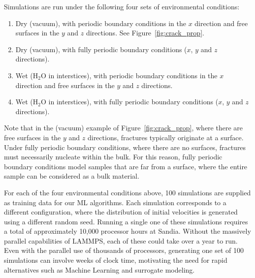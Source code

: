 Simulations are run under the following four sets of environmental conditions:

\begin{enumerate}
    \item Dry (vacuum), with periodic boundary conditions in the $x$ direction and free surfaces in the $y$ and $z$ directions. See Figure~\ref{fig:crack_prop}.
    \item Dry (vacuum), with fully periodic boundary conditions ($x$, $y$ and $z$ directions).
    \item Wet (H$_2$O in interstices), with periodic boundary conditions in the $x$ direction and free surfaces in the $y$ and $z$ directions.
    \item Wet (H$_2$O in interstices), with fully periodic boundary conditions ($x$, $y$ and $z$ directions).
\end{enumerate}

\noindent
Note that in the (vacuum) example of Figure~\ref{fig:crack_prop}, where there are free surfaces in the $y$ and $z$ directions, fractures typically originate at a surface.  Under fully periodic boundary conditions, where there are no surfaces, fractures must necessarily nucleate within the bulk. For this reason, fully periodic boundary conditions model samples that are far from a surface, where the entire sample can be considered as a bulk material.

For each of the four environmental conditions above, 100 simulations are supplied as training data for our ML algorithms.  Each simulation corresponds to a different configuration, where the distribution of initial velocities is generated using a different random seed.  Running a single one of these simulations requires a total of approximately 10,000 processor hours at Sandia. Without the massively parallel capabilities of LAMMPS, each of these could take over a year to run.  Even with the parallel use of thousands of processors, generating one set of 100 simulations can involve weeks of clock time, motivating the need for rapid alternatives such as Machine Learning and surrogate modeling.



